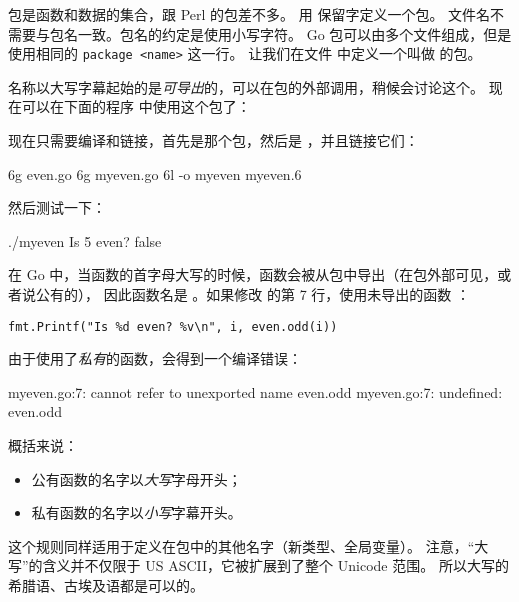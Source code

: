 \noindent{}
包是函数和数据的集合，跟 Perl 的包\cite{perl-packages}差不多。
用  保留字定义一个包。
文件名不需要与包名一致。包名的约定是使用小写字符。
Go 包可以由多个文件组成，但是使用相同的 \lstinline{package <name>} 这一行。
让我们在文件  中定义一个叫做  的包。


名称以大写字幕起始的是\emph{可导出}的，可以在包的外部调用，稍候会讨论这个。
现在可以在下面的程序  中使用这个包了：


\showremarks

现在只需要编译和链接，首先是那个包，然后是 ，并且链接它们：
\begin{display}
\pr 6g even.go			
\pr 6g myeven.go		
\pr 6l -o myeven myeven.6       
\end{display}
然后测试一下：
\begin{display}
\pr ./myeven
Is 5 even? false
\end{display}

在 Go 中，当函数的首字母大写的时候，函数会被从包中导出（在包外部可见，或者说公有的），
因此函数名是 。如果修改  的第 7 行，使用未导出的函数
：

\noindent\lstinline{fmt.Printf("Is %d even? %v\n", i, even.odd(i))}

由于使用了\emph{私有}的函数，会得到一个编译错误：
\begin{display}
myeven.go:7: cannot refer to unexported name even.odd
myeven.go:7: undefined: even.odd
\end{display}

\noindent{}概括来说：
\begin{itemize}
\item 公有函数的名字以\emph{大写}字母开头；
\item 私有函数的名字以\emph{小写}字幕开头。
\end{itemize}
这个规则同样适用于定义在包中的其他名字（新类型、全局变量）。
注意，“大写”的含义并不仅限于 US ASCII，它被扩展到了整个 Unicode 范围。
所以大写的希腊语、古埃及语都是可以的。

